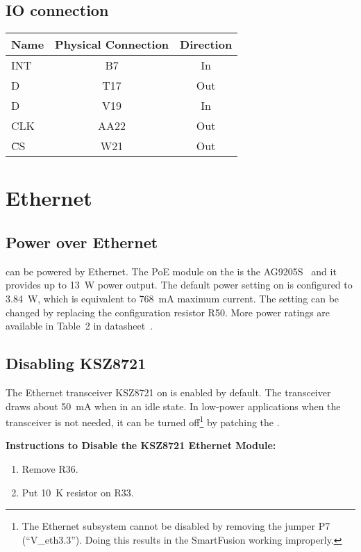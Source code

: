 \subsection{IO connection}
\begin{table}[h]
\centering
\begin{tabular}{|l|c|c|}
	\hline
	{\bf Name} & {\bf Physical Connection} & {\bf Direction}\\ \hline
	INT & B7 & In\\ \hline\hline
	D\subscript{IN} & T17 & Out\\ \hline
	D\subscript{OUT} & V19 & In\\ \hline
	CLK & AA22 & Out\\ \hline
	\={CS} & W21 & Out\\ \hline
\end{tabular}
\end{table}

\clearpage
\section{Ethernet}
\subsection{Power over Ethernet}
\sdr can be powered by Ethernet. The PoE module on the \sdr is the AG9205S~\cite{AG9200S} and it provides up to
13~W power output. The default power setting on \sdr is configured to 3.84~W, which is equivalent to 768~mA
maximum current. The setting can be changed by replacing the configuration
resistor R50. More power ratings are available in Table~2 in datasheet~\cite{AG9200S}.

\subsection{Disabling KSZ8721}
The Ethernet transceiver KSZ8721 on \sdr is enabled by default. The transceiver draws about 50~mA
when in an idle state. In low-power applications when the transceiver is not needed, it can be turned off\footnote{
The Ethernet subsystem cannot be disabled by removing the jumper P7 (``V\_eth3.3''). Doing this results in the SmartFusion working
improperly.} by patching the \sdr.

{\bf Instructions to Disable the KSZ8721 Ethernet Module:}
\begin{enumerate}[noitemsep]
	\item Remove R36.
	\item Put 10~K resistor on R33.
\end{enumerate}

